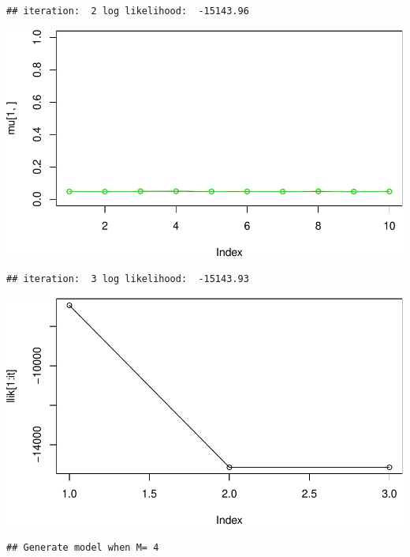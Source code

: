 \documentclass[
]{article}
\begin{document}
\begin{verbatim}
## iteration:  2 log likelihood:  -15143.96
\end{verbatim}

\includegraphics{Lab1Block2_files/figure-latex/unnamed-chunk-1-9.pdf}

\begin{verbatim}
## iteration:  3 log likelihood:  -15143.93
\end{verbatim}

\includegraphics{Lab1Block2_files/figure-latex/unnamed-chunk-1-10.pdf}

\begin{verbatim}
## Generate model when M= 4
\end{verbatim}
\end{document}
